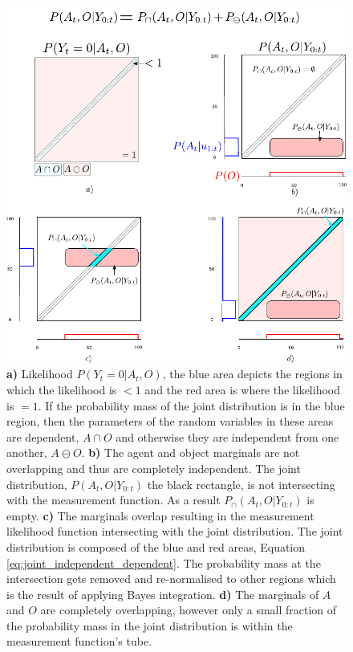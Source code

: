 %
 
 \begin{figure}
 \centering
  \includegraphics[width=\textwidth]{./ch5-MLMF/Figures/Figure7.pdf}
  \caption{
  \textbf{a)} Likelihood $P(Y_t=0|A_t,O)$, the blue area depicts the regions in which the likelihood is $<1$ 
  and the red area is where the likelihood is $=1$. If the probability mass of the joint distribution 
  is in the blue region, then the parameters of the random variables in these areas are dependent, $A \cap O$
  and otherwise they are independent from one another, $A \ominus O$.  
   \textbf{b)} The agent and object marginals are not overlapping and thus are completely independent. The joint distribution, 
   $P(A_t,O|Y_{0:t})$ the black rectangle,  is not intersecting with the measurement function. As a result $P_{\cap}(A_t,O|Y_{0:t})$
   is empty.
 \textbf{c)} The marginals overlap resulting in the measurement likelihood function intersecting with the joint distribution.
 The joint distribution is composed of the blue and red areas, Equation \ref{eq:joint_independent_dependent}.
 The probability mass at the intersection gets removed and re-normalised to other regions which is the result of applying Bayes integration. 
 \textbf{d)} The marginals of $A$ and $O$ are completely overlapping, however only a small fraction of the probability mass 
 in the joint distribution is within the measurement function's tube.}
  \label{fig:overlap_dependence_independence}
\end{figure}

